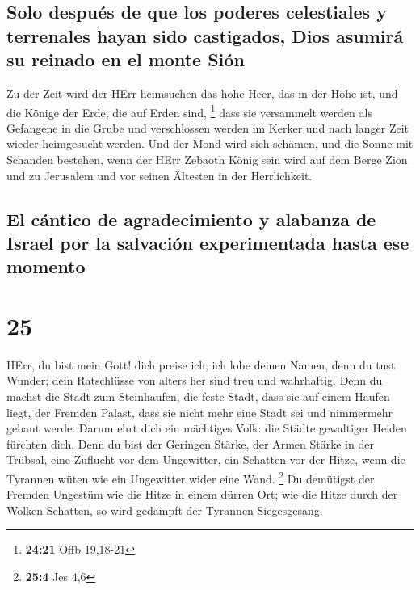 \hypertarget{solo-despuuxe9s-de-que-los-poderes-celestiales-y-terrenales-hayan-sido-castigados-dios-asumiruxe1-su-reinado-en-el-monte-siuxf3n}{%
\subsection{Solo después de que los poderes celestiales y terrenales
hayan sido castigados, Dios asumirá su reinado en el monte
Sión}\label{solo-despuuxe9s-de-que-los-poderes-celestiales-y-terrenales-hayan-sido-castigados-dios-asumiruxe1-su-reinado-en-el-monte-siuxf3n}}

 Zu der Zeit wird der HErr heimsuchen das hohe Heer, das
in der Höhe ist, und die Könige der Erde, die auf Erden sind,
\footnote{\textbf{24:21} Offb 19,18-21}  dass sie
versammelt werden als Gefangene in die Grube und verschlossen werden im
Kerker und nach langer Zeit wieder heimgesucht werden. 
Und der Mond wird sich schämen, und die Sonne mit Schanden bestehen,
wenn der HErr Zebaoth König sein wird auf dem Berge Zion und zu
Jerusalem und vor seinen Ältesten in der Herrlichkeit.

\hypertarget{el-cuxe1ntico-de-agradecimiento-y-alabanza-de-israel-por-la-salvaciuxf3n-experimentada-hasta-ese-momento}{%
\subsection{El cántico de agradecimiento y alabanza de Israel por la
salvación experimentada hasta ese
momento}\label{el-cuxe1ntico-de-agradecimiento-y-alabanza-de-israel-por-la-salvaciuxf3n-experimentada-hasta-ese-momento}}

\hypertarget{section-24}{%
\section{25}\label{section-24}}

 HErr, du bist mein Gott! dich preise ich; ich lobe deinen
Namen, denn du tust Wunder; dein Ratschlüsse von alters her sind treu
und wahrhaftig.  Denn du machst die Stadt zum Steinhaufen,
die feste Stadt, dass sie auf einem Haufen liegt, der Fremden Palast,
dass sie nicht mehr eine Stadt sei und nimmermehr gebaut werde.
 Darum ehrt dich ein mächtiges Volk: die Städte gewaltiger
Heiden fürchten dich.  Denn du bist der Geringen Stärke,
der Armen Stärke in der Trübsal, eine Zuflucht vor dem Ungewitter, ein
Schatten vor der Hitze, wenn die Tyrannen wüten wie ein Ungewitter wider
eine Wand. \footnote{\textbf{25:4} Jes 4,6}  Du demütigst
der Fremden Ungestüm wie die Hitze in einem dürren Ort; wie die Hitze
durch der Wolken Schatten, so wird gedämpft der Tyrannen Siegesgesang.

